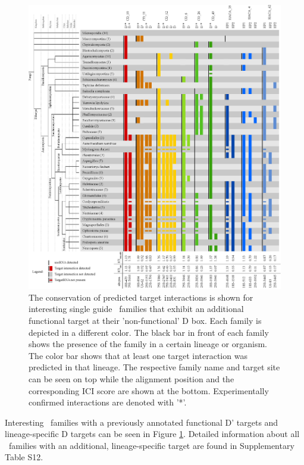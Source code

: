 \begin{figure}
  \centering
  \includegraphics[width=\textwidth]{pics/conservation_lineage_specific_targets.eps}
  \caption{The conservation of predicted target interactions is shown
    for interesting single guide \cd\ families that exhibit an
    additional functional target at their 'non-functional' D box. Each
    family is depicted in a different color. The black bar in front of
    each family shows the presence of the family in a certain lineage
    or organism. The color bar shows that at least one target
    interaction was predicted in that lineage. The respective family
    name and target site can be seen on top while the alignment
    position and the corresponding ICI score are shown at the
    bottom. Experimentally confirmed interactions are denoted with
    '*'.}
  \label{fig:additional_targets}
\end{figure}

Interesting \cd\ families with a previously annotated functional D'
targets and lineage-specific D targets can be seen in Figure
\ref{fig:additional_targets}. Detailed information about all \sno\
families with an additional, lineage-specific target are found in
Supplementary Table S12.

